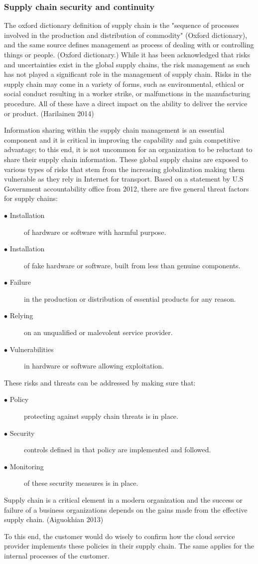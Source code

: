 \documentclass{article}
\begin{document}
\subsubsection{Supply chain security and continuity}
The oxford dictionary definition of supply chain is the "sequence of processes involved in the production and distribution of commodity" (Oxford dictionary), and the same source defines management as process of dealing with or controlling things or people. (Oxford dictionary.) 
While it has been acknowledged that risks and uncertainties exist in the global supply chains, the risk management as such has not played a significant role in the management of supply chain. Risks in the supply chain may come in a variety of forms, such as environmental, ethical or social conduct resulting in a worker strike, or malfunctions in the manufacturing procedure. All of these have a direct impact on the ability to deliver the service or product. (Harilainen 2014)
\par
Information sharing within the supply chain management is an essential component and it is critical in improving the capability and gain competitive advantage; to this end, it is not uncommon for an organization to be reluctant to share their supply chain information. These global supply chains are exposed to various types of risks that stem from the increasing globalization making them vulnerable as they rely in Internet for transport. Based on a statement by U.S Government accountability office from 2012, there are five general threat factors for supply chains:
\begin{description}
	\item[$\bullet$ Installation] of hardware or software with harmful purpose.
	\item[$\bullet$ Installation] of fake hardware or software, built from less than genuine components.
	\item[$\bullet$ Failure] in the production or distribution of essential products for any reason.
	\item[$\bullet$ Relying] on an unqualified or malevolent service provider.
	\item[$\bullet$ Vulnerabilities] in hardware or software allowing exploitation.
\end{description}
These risks and threats can be addressed by making sure that:
\begin{description}
	\item[$\bullet$ Policy] protecting against supply chain threats is in place.
	\item[$\bullet$ Security] controls defined in that policy are implemented and followed.
	\item[$\bullet$ Monitoring] of these security measures is in place.
\end{description}
Supply chain is a critical element in a modern organization and the success or failure of a business organizations depends on the gains made from the effective supply chain. (Aiguokhian 2013)
\par
To this end, the customer would do wisely to confirm how the cloud service provider implements these policies in their supply chain. The same applies for the internal processes of the customer. 
\end{document}
